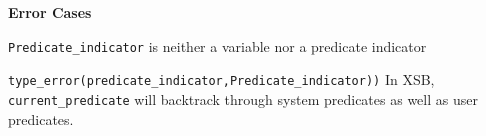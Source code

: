 \begin{description}
\noindent
{\bf Error Cases}
\bi
\item 	{\tt Predicate\_indicator} is neither a variable nor a predicate indicator
\bi
\item 	{\tt type\_error(predicate\_indicator,Predicate\_indicator))}
\ei
\ei
%
\compatibility
%
In XSB, {\tt current\_predicate} will backtrack through system
predicates as well as user predicates.


\comment{
%
%
}
\end{description}

